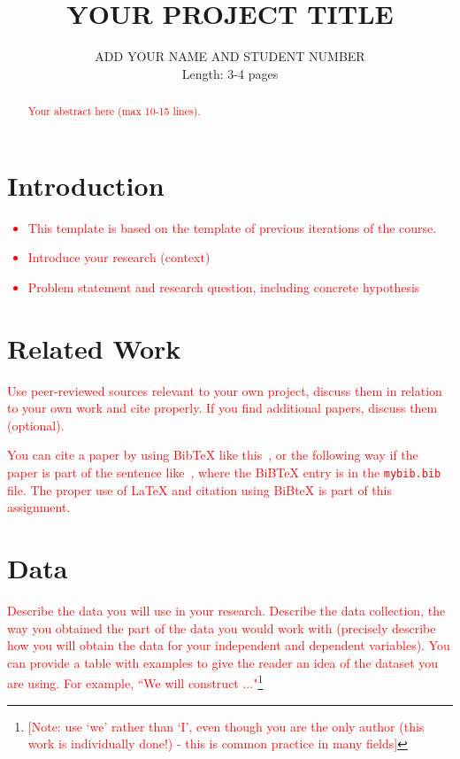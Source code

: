 \documentclass[11pt]{article}
\title{YOUR PROJECT TITLE}
\author{ADD YOUR NAME AND STUDENT NUMBER\\
Length: 3-4 pages}
\date{}
\begin{document}
\maketitle

\begin{abstract}
\textcolor{red}{Your abstract here (max 10-15 lines).}
\end{abstract}


\section{Introduction}

\textcolor{red}{
\begin{itemize}
\item This template is based on the template of previous iterations of the course.
\item Introduce your research (context)
\item Problem statement and research question, including concrete hypothesis
\end{itemize}
} 

\section{Related Work}

\textcolor{red}{Use peer-reviewed sources relevant to your own project, discuss them in relation to your own work and cite properly. If you find additional papers, discuss them (optional).}

\textcolor{red}{You can cite a paper by using BibTeX like this~\citep{Culotta:ea:2014}, or the following way if the paper is part of the sentence like~\cite{Culotta:ea:2014}, where the BiBTeX entry is in the \texttt{mybib.bib} file. The proper use of \LaTeX{} and citation using BiBteX is part of this assignment.} 

\section{Data}

\textcolor{red}{Describe the data you will use in your research. Describe the data collection, the way you obtained the part of the data you would work with (precisely describe how you will obtain the data for your independent and dependent variables). You can provide a table with examples to give the reader an idea of the dataset you are using. For example, ``We will construct ..."\footnote{\textcolor{red}{[Note: use `we' rather than `I', even though you are the only author (this work is individually done!) - this is common practice in many fields]}}}
\end{document}
